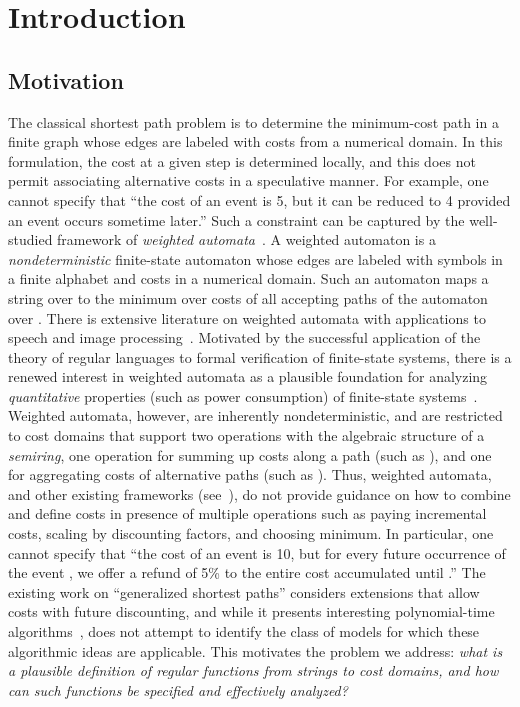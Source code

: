 \documentclass[11pt]{article}
\newcommand{\mypar}[1]{\subsection{#1}}
\begin{document}
\section{Introduction}
\mypar{Motivation}
The classical shortest path problem is to determine the minimum-cost
path in a finite graph whose edges are labeled with costs from a
numerical domain.  In this formulation, the cost at a given step is
determined locally, and this does not permit associating alternative
costs in a speculative manner. For example, one cannot specify that
``the cost of an event  is 5, but it can be reduced to 4 provided
an event  occurs sometime later.'' Such a constraint can be
captured by the well-studied framework of {\em weighted
automata\/}~\cite{Sch61,droste_handbook_2009}.  A weighted automaton
is a {\em nondeterministic\/} finite-state automaton whose edges are
labeled with symbols in a finite alphabet  and costs in a
numerical domain. Such an automaton maps a string  over  to
the minimum over costs of all accepting paths of the automaton over
.  There is extensive literature on weighted automata with
applications to speech and image processing~\cite{MPR02}.  Motivated
by the successful application of the theory of regular languages to
formal verification of finite-state systems, there is a renewed
interest in weighted automata as a plausible foundation for analyzing
{\em quantitative\/} properties (such as power consumption) of
finite-state systems~\cite{CDH10,AKL10,almagor_what_2011}.  Weighted
automata, however, are inherently nondeterministic, and are restricted
to cost domains that support two operations with the algebraic
structure of a {\em semiring}, one operation for summing up costs
along a path (such as ), and one for aggregating costs of
alternative paths (such as ).  Thus, weighted automata, and
other existing frameworks
(see~\cite{colcombet_regular_2010,neven_finite_2004}), do not provide
guidance on how to combine and define costs in presence of multiple
operations such as paying incremental costs, scaling by discounting
factors, and choosing minimum.  In particular, one cannot specify that
``the cost of an event  is 10, but for every future occurrence of
the event , we offer a refund of 5\% to the entire cost
accumulated until .'' The existing work on ``generalized shortest
paths'' considers extensions that allow costs with future discounting,
and while it presents interesting polynomial-time
algorithms~\cite{goldberg_combinatorial_1988,
oldham_combinatorial_1999}, does not attempt to identify the class of
models for which these algorithmic ideas are applicable.  This
motivates the problem we address: {\em what is a plausible definition
of regular functions from strings to cost domains, and how can such
functions be specified and effectively analyzed?\/}
\end{document}
